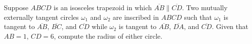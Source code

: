 Suppose $ABCD$ is an isosceles trapezoid in which $\overline{AB}\parallel\overline{CD}$. Two mutually externally tangent circles $\omega_1$ and $\omega_2$ are inscribed in $ABCD$ such that $\omega_1$ is tangent to $\overline{AB}$, $\overline{BC}$, and $\overline{CD}$ while $\omega_2$ is tangent to $\overline{AB}$, $\overline{DA}$, and $\overline{CD}$. Given that $AB=1$, $CD=6$, compute the radius of either circle.